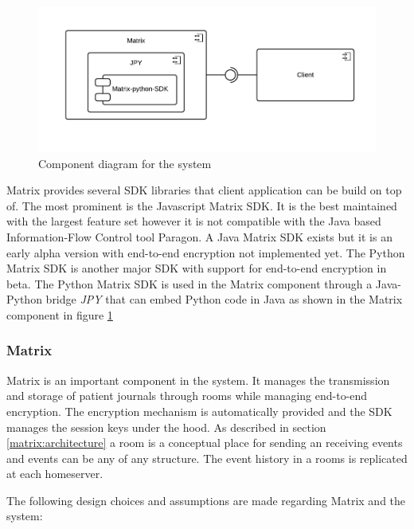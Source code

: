 \begin{figure}[H] 
	\hspace*{-1cm}
	\centering
	\includegraphics[width=14cm]{figures/matrix_component.png}
	\caption{Component diagram for the system}
	\label{fig:matrix_component}
\end{figure}

Matrix provides several SDK libraries that client application can be build on top of. The most prominent is the Javascript Matrix SDK. It is the best maintained with the largest feature set however it is not compatible with the Java based Information-Flow Control tool Paragon. A Java Matrix SDK exists but it is an early alpha version with end-to-end encryption not implemented yet. The Python Matrix SDK is another major SDK with support for end-to-end encryption in beta. The Python Matrix SDK is used in the Matrix component through a Java-Python bridge \emph{JPY} that can embed Python code in Java as shown in the Matrix component in figure \ref{fig:matrix_component} 


\subsubsection{Matrix}
Matrix is an important component in the system. It manages the transmission and storage of patient journals through rooms while managing end-to-end encryption. The encryption mechanism is automatically provided and the SDK manages the session keys under the hood.  As described in section \ref{matrix:architecture} a room is a conceptual place for sending an receiving events and events can be any of any structure. The event history in a rooms is replicated at each homeserver. 

The following design choices and assumptions are made regarding Matrix and the system: 

